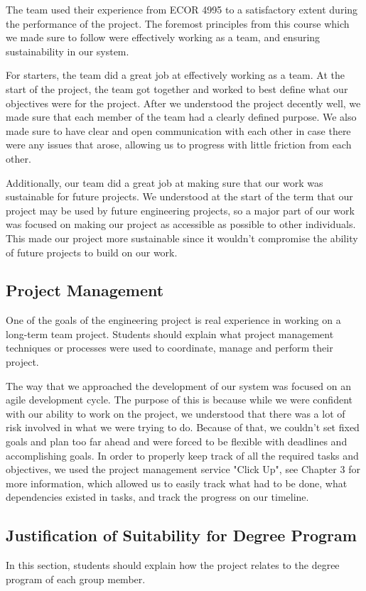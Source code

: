 \documentclass[titlepage]{article}
\begin{document}
The team used their experience from ECOR 4995 to a satisfactory extent during the performance of the project. The foremost principles from this course which we made sure to follow were effectively working as a team, and ensuring sustainability in our system. 

For starters, the team did a great job at effectively working as a team. At the start of the project, the team got together and worked to best define what our objectives were for the project. After we understood the project decently well, we made sure that each member of the team had a clearly defined purpose. We also made sure to have clear and open communication with each other in case there were any issues that arose, allowing us to progress with little friction from each other.

Additionally, our team did a great job at making sure that our work was sustainable for future projects. We understood at the start of the term that our project may be used by future engineering projects, so a major part of our work was focused on making our project as accessible as possible to other individuals. This made our project more sustainable since it wouldn't compromise the ability of future projects to build on our work.

\subsection{Project Management}
One of the goals of the engineering project is real experience in working on a long-term team project. Students should explain what project management techniques or processes were used to coordinate, manage and perform their project.

The way that we approached the development of our system was focused on an agile development cycle. The purpose of this is because while we were confident with our ability to work on the project, we understood that there was a lot of risk involved in what we were trying to do. Because of that, we couldn't set fixed goals and plan too far ahead and were forced to be flexible with deadlines and accomplishing goals. In order to properly keep track of all the required tasks and objectives, we used the project management service "Click Up", see Chapter 3 for more information, which allowed us to easily track what had to be done, what dependencies existed in tasks, and track the progress on our timeline.

\subsection{Justification of Suitability for Degree Program}
In this section, students should explain how the project
relates to the degree program of each group member.
\end{document}
